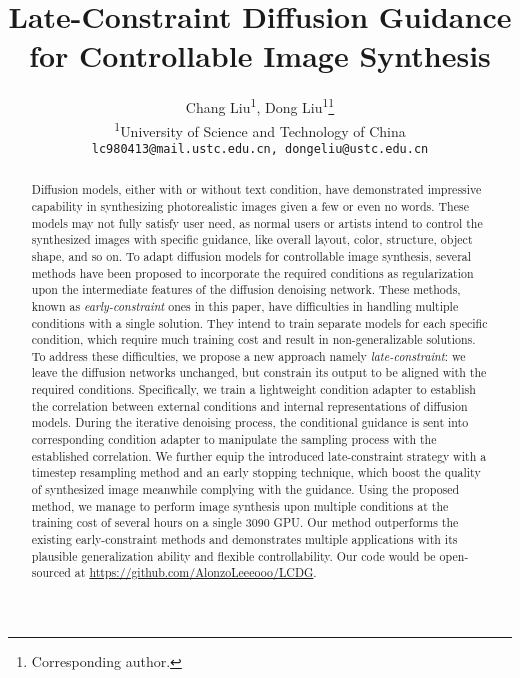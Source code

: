 \documentclass{article}
\title{Late-Constraint Diffusion Guidance for Controllable Image Synthesis}
\author{Chang Liu\textsuperscript{1}, Dong Liu\textsuperscript{1}\thanks{Corresponding author.}\\
  \textsuperscript{1}University of Science and Technology of China\\
  \texttt{lc980413@mail.ustc.edu.cn, dongeliu@ustc.edu.cn}
}
\begin{document}
\maketitle


\begin{abstract}


Diffusion models, either with or without text condition, have demonstrated impressive capability in synthesizing photorealistic images given a few or even no words. These models may not fully satisfy user need, as normal users or artists intend to control the synthesized images with specific guidance, like overall layout, color, structure, object shape, and so on. To adapt diffusion models for controllable image synthesis, several methods have been proposed to incorporate the required conditions as regularization upon the intermediate features of the diffusion denoising network. These methods, known as \emph{early-constraint} ones in this paper, have difficulties in handling multiple conditions with a single solution. They intend to train separate models for each specific condition, which require much training cost and result in non-generalizable solutions. To address these difficulties, we propose a new approach namely \emph{late-constraint}: we leave the diffusion networks unchanged, but constrain its output to be aligned with the required conditions. Specifically, we train a lightweight condition adapter to establish the correlation between external conditions and internal representations of diffusion models. During the iterative denoising process, the conditional guidance is sent into corresponding condition adapter to manipulate the sampling process with the established correlation. We further equip the introduced late-constraint strategy with a timestep resampling method and an early stopping technique, which boost the quality of synthesized image meanwhile complying with the guidance. Using the proposed method, we manage to perform image synthesis upon multiple conditions at the training cost of several hours on a single 3090 GPU. Our method outperforms the existing early-constraint methods and demonstrates multiple applications with its plausible generalization ability and flexible controllability. Our code would be open-sourced at \href{https://github.com/AlonzoLeeeooo/LCDG}{https://github.com/AlonzoLeeeooo/LCDG}.







\end{abstract}  
\end{document}
